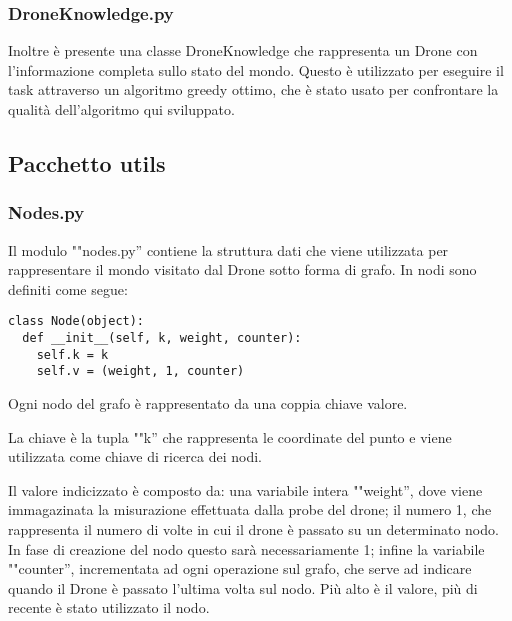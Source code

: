 \subsubsection{DroneKnowledge.py}
Inoltre è presente una classe DroneKnowledge che rappresenta un Drone con l'informazione completa sullo stato del mondo. Questo è utilizzato per eseguire il task attraverso un algoritmo greedy ottimo, che è stato usato per confrontare la qualità dell'algoritmo qui sviluppato.

\subsection{Pacchetto utils}

\subsubsection{Nodes.py}
Il modulo ""nodes.py'' contiene la struttura dati che viene utilizzata per rappresentare il mondo visitato dal Drone sotto forma di grafo. In nodi sono definiti come segue:
\begin{verbatim} 
class Node(object):
  def __init__(self, k, weight, counter):
    self.k = k
    self.v = (weight, 1, counter)
\end{verbatim}
Ogni nodo del grafo è rappresentato da una coppia chiave valore. 

La chiave è la tupla ""k'' che rappresenta le coordinate del punto e viene utilizzata come chiave di ricerca dei nodi. 

Il valore indicizzato è composto da: una variabile intera ""weight'', dove viene immagazinata la misurazione effettuata dalla probe del drone; il numero 1, che rappresenta il numero di volte in cui il drone è passato su un determinato nodo. In fase di creazione del nodo questo sarà necessariamente 1; infine la variabile ""counter'', incrementata ad ogni operazione sul grafo, che serve ad indicare quando il Drone è passato l'ultima volta sul nodo. Più alto è il valore, più di recente è stato utilizzato il nodo. 

